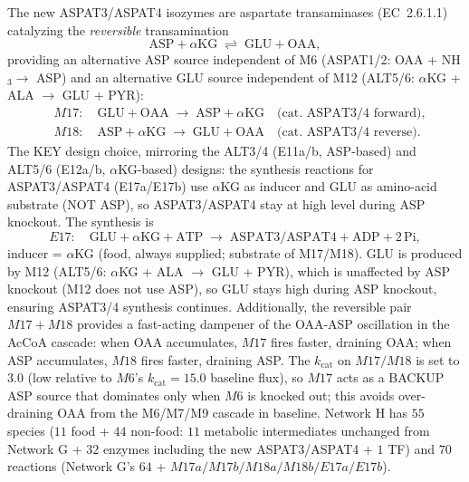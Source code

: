 \documentclass[11pt,a4paper]{article}
\theoremstyle{plain}
\theoremstyle{definition}
\theoremstyle{remark}
\begin{document}
The new ASPAT3/ASPAT4 isozymes are aspartate transaminases
(EC~2.6.1.1) catalyzing the \emph{reversible} transamination
\[
  \mathrm{ASP} + \alpha\mathrm{KG} \;\rightleftharpoons\; \mathrm{GLU} + \mathrm{OAA},
\]
providing an alternative ASP source independent of M6 (ASPAT1/2:
OAA + NH$_3 \to$ ASP) and an alternative GLU source independent of
M12 (ALT5/6: $\alpha$KG + ALA $\to$ GLU + PYR):
\begin{equation}\label{eq:netH-M17-M18}
\begin{aligned}
  &M17: \quad \mathrm{GLU} + \mathrm{OAA} \;\to\; \mathrm{ASP} + \alpha\mathrm{KG}
  \quad \text{(cat.\ ASPAT3/4 forward)}, \\
  &M18: \quad \mathrm{ASP} + \alpha\mathrm{KG} \;\to\; \mathrm{GLU} + \mathrm{OAA}
  \quad \text{(cat.\ ASPAT3/4 reverse)}.
\end{aligned}
\end{equation}
The KEY design choice, mirroring the ALT3/4 (E11a/b, ASP-based) and
ALT5/6 (E12a/b, $\alpha$KG-based) designs: the synthesis reactions for
ASPAT3/ASPAT4 (E17a/E17b) use $\alpha$KG as inducer and GLU as
amino-acid substrate (NOT ASP), so ASPAT3/ASPAT4 stay at high level
during ASP knockout. The synthesis is
\[
  E17: \quad \mathrm{GLU} + \alpha\mathrm{KG} + \mathrm{ATP} \;\to\;
  \mathrm{ASPAT3}/\mathrm{ASPAT4} + \mathrm{ADP} + 2\,\mathrm{Pi},
\]
inducer = $\alpha$KG (food, always supplied; substrate of M17/M18).
GLU is produced by M12 (ALT5/6: $\alpha$KG + ALA $\to$ GLU + PYR),
which is unaffected by ASP knockout (M12 does not use ASP), so GLU
stays high during ASP knockout, ensuring ASPAT3/4 synthesis continues.
Additionally, the reversible pair $M17 + M18$ provides a fast-acting
dampener of the OAA-ASP oscillation in the AcCoA cascade: when OAA
accumulates, $M17$ fires faster, draining OAA; when ASP accumulates,
$M18$ fires faster, draining ASP. The $k_{\mathrm{cat}}$ on
$M17/M18$ is set to $3.0$ (low relative to $M6$'s $k_{\mathrm{cat}} =
15.0$ baseline flux), so $M17$ acts as a BACKUP ASP source that
dominates only when $M6$ is knocked out; this avoids over-draining
OAA from the M6/M7/M9 cascade in baseline. Network H has $55$ species
($11$ food + $44$ non-food: $11$ metabolic intermediates unchanged from
Network G + $32$ enzymes including the new ASPAT3/ASPAT4 + $1$ TF) and
$70$ reactions (Network G's $64$ + $M17a/M17b/M18a/M18b/E17a/E17b$).
\end{document}
